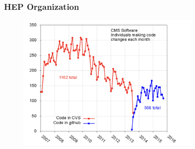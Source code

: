 \begin{frame}
\frametitle{HEP Organization}

\begin{figure}[htbp]
\begin{center}
\includegraphics[width=0.8\textwidth]{images/cmssw-software-contributors-cvs-github.png}
\end{center}
\end{figure}


\end{frame}


